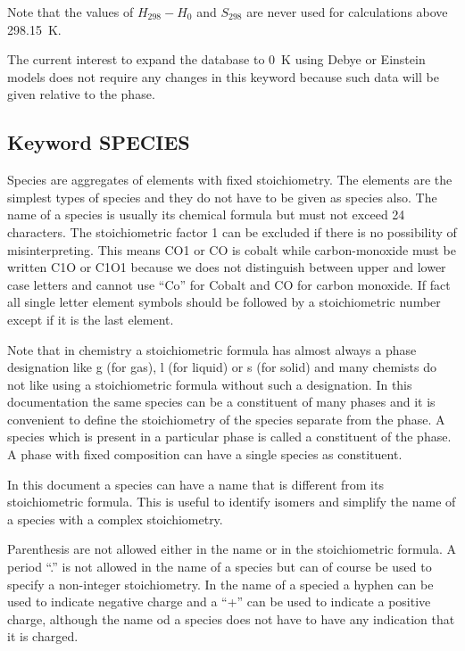 \documentclass[12pt]{article}
\begin{document}
Note that the values of $H_{298}-H_{0}$ and $S_{298}$ are never used
for calculations above 298.15~K.

The current interest to expand the database to 0~K using Debye or
Einstein models does not require any changes in this keyword because
such data will be given relative to the phase.

\subsection{Keyword SPECIES}

Species are aggregates of elements with fixed stoichiometry.  The
elements are the simplest types of species and they do not have to be
given as species also.  The name of a species is usually its chemical
formula but must not exceed 24 characters.  The stoichiometric factor
1 can be excluded if there is no possibility of misinterpreting.  This
means CO1 or CO is cobalt while carbon-monoxide must be written C1O or
C1O1 because we does not distinguish between upper and lower case
letters and cannot use ``Co'' for Cobalt and CO for carbon monoxide.
If fact all single letter element symbols should be followed by a
stoichiometric number except if it is the last element.

Note that in chemistry a stoichiometric formula has almost always a
phase designation like g (for gas), l (for liquid) or s (for solid)
and many chemists do not like using a stoichiometric formula without
such a designation.  In this documentation the same species can be a
constituent of many phases and it is convenient to define the
stoichiometry of the species separate from the phase.  A species which
is present in a particular phase is called a constituent of the phase.
A phase with fixed composition can have a single species as
constituent.

In this document a species can have a name that is different from its
stoichiometric formula.  This is useful to identify isomers and
simplify the name of a species with a complex stoichiometry.

Parenthesis are not allowed either in the name or in the
stoichiometric formula.  A period ``.'' is not allowed in the name of
a species but can of course be used to specify a non-integer
stoichiometry.  In the name of a specied a hyphen can be used to
indicate negative charge and a ``+'' can be used to indicate a
positive charge, although the name od a species does not have to have
any indication that it is charged.
\end{document}
